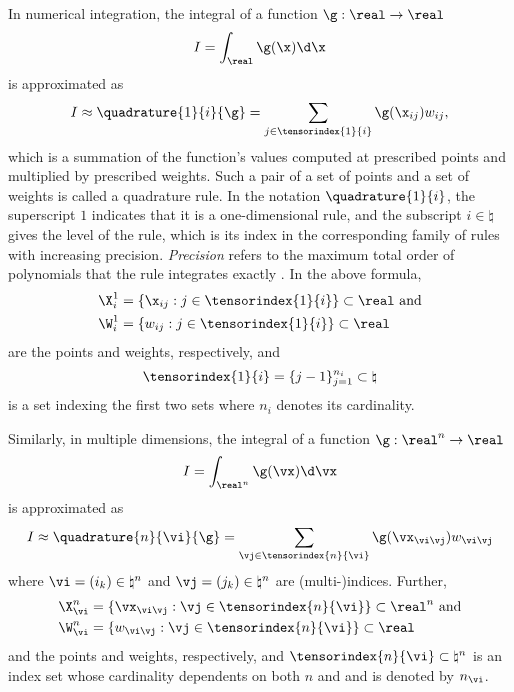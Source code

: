 In numerical integration, the integral of a function $\g: \real \to \real$
\[
  I = \int_\real \g(\x) \d \x
\]
is approximated as
\[
  I \approx \quadrature{1}{i}{\g} = \sum_{j \in \tensorindex{1}{i}} \g(\x_{ij}) w_{ij},
\]
which is a summation of the function's values computed at prescribed points and
multiplied by prescribed weights. Such a pair of a set of points and a set of
weights is called a quadrature rule. In the notation $\quadrature{1}{i}$, the
superscript $1$ indicates that it is a one-dimensional rule, and the subscript
$i \in \natural$ gives the level of the rule, which is its index in the
corresponding family of rules with increasing precision. \emph{Precision} refers
to the maximum total order of polynomials that the rule integrates exactly
\cite{heiss2008}. In the above formula,
\[
  \begin{split}
    & \X^1_i = \{ \x_{ij}: j \in \tensorindex{1}{i} \} \subset \real \text{ and} \\
    & \W^1_i = \{ w_{ij}: j \in \tensorindex{1}{i} \} \subset \real
  \end{split}
\]
are the points and weights, respectively, and
\[
  \tensorindex{1}{i} = \{ j - 1 \}_{j = 1}^{n_i} \subset \natural
\]
is a set indexing the first two sets where $n_i$ denotes its cardinality.

Similarly, in multiple dimensions, the integral of a function $\g: \real^n \to
\real$
\[
  I = \int_{\real^n} \g(\vx) \d \vx
\]
is approximated as
\[
  I \approx \quadrature{n}{\vi}{\g} = \sum_{\vj \in \tensorindex{n}{\vi}} \g(\vx_{\vi \vj}) w_{\vi \vj}
\]
where $\vi = (i_k) \in \natural^n$ and $\vj = (j_k) \in \natural^n$ are
(multi-)indices. Further,
\[
  \begin{split}
    & \X^n_{\vi} = \{ \vx_{\vi \vj}: \vj \in \tensorindex{n}{\vi} \} \subset \real^n \text{ and} \\
    & \W^n_{\vi} = \{ w_{\vi \vj}: \vj \in \tensorindex{n}{\vi} \} \subset \real
  \end{split}
\]
and the points and weights, respectively, and $\tensorindex{n}{\vi} \subset
\natural^n$ is an index set whose cardinality dependents on both $n$ and \vi and
is denoted by $n_{\vi}$.

